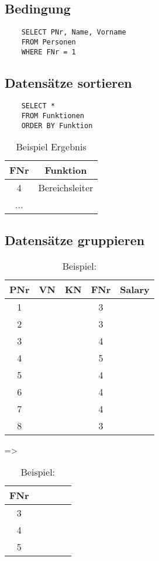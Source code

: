 \documentclass{article}
\begin{document}
\subsection{Bedingung}

\begin{verbatim}
    SELECT PNr, Name, Vorname
    FROM Personen
    WHERE FNr = 1
\end{verbatim}

\newpage
\subsection{Datensätze sortieren}

\begin{verbatim}
    SELECT *
    FROM Funktionen
    ORDER BY Funktion
\end{verbatim}

\begin{table}[!htbp]
  \center
  \begin{tabular}{c|c}
    FNr & Funktion       \\
    \hline
    4   & Bereichsleiter \\
    ...
  \end{tabular}
  \label{tab:order:1}
  \caption{Beispiel Ergebnis}
\end{table}

\subsection{Datensätze gruppieren}


\begin{table}[!htbp]
  \center
  \begin{tabular}{ccccc}
    PNr & VN & KN & FNr & Salary \\
    \hline
    1   &    &    & 3   &        \\
    2   &    &    & 3   &        \\
    3   &    &    & 4   &        \\
    4   &    &    & 5   &        \\
    5   &    &    & 4   &        \\
    6   &    &    & 4   &        \\
    7   &    &    & 4   &        \\
    8   &    &    & 3   &        \\
  \end{tabular}
  \quad
  =>
  \quad
  \begin{tabular}{ccccc}
    FNr & \\
    \hline
    3   & \\
    4   & \\
    5   & \\
  \end{tabular}
  \label{tab:group:1}
  \caption{Beispiel: \protect{}}
\end{table}
\end{document}
